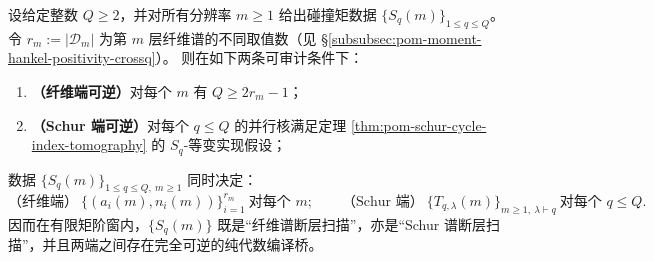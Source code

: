 \begin{theorem}\label{thm:pom-fiber-schur-bidirectional-compilation}
设给定整数 \(Q\ge 2\)，并对所有分辨率 \(m\ge 1\) 给出碰撞矩数据 \(\{S_q(m)\}_{1\le q\le Q}\)。
令 \(r_m:=|\mathcal{D}_m|\) 为第 \(m\) 层纤维谱的不同取值数（见 \S\ref{subsubsec:pom-moment-hankel-positivity-crossq}）。
则在如下两条可审计条件下：
\begin{enumerate}
  \item \textbf{（纤维端可逆）}对每个 \(m\) 有 \(Q\ge 2r_m-1\)；
  \item \textbf{（Schur 端可逆）}对每个 \(q\le Q\) 的并行核满足定理 \ref{thm:pom-schur-cycle-index-tomography} 的 \(S_q\)-等变实现假设；
\end{enumerate}
数据 \(\{S_q(m)\}_{1\le q\le Q,\ m\ge 1}\) 同时决定：
\[
\text{（纤维端）}\ \{(a_i(m),n_i(m))\}_{i=1}^{r_m}\ \text{对每个 }m;\qquad
\text{（Schur 端）}\ \{T_{q,\lambda}(m)\}_{m\ge 1,\ \lambda\vdash q}\ \text{对每个 }q\le Q.
\]
因而在有限矩阶窗内，\(\{S_q(m)\}\) 既是“纤维谱断层扫描”，亦是“Schur 谱断层扫描”，并且两端之间存在完全可逆的纯代数编译桥。
\end{theorem}

